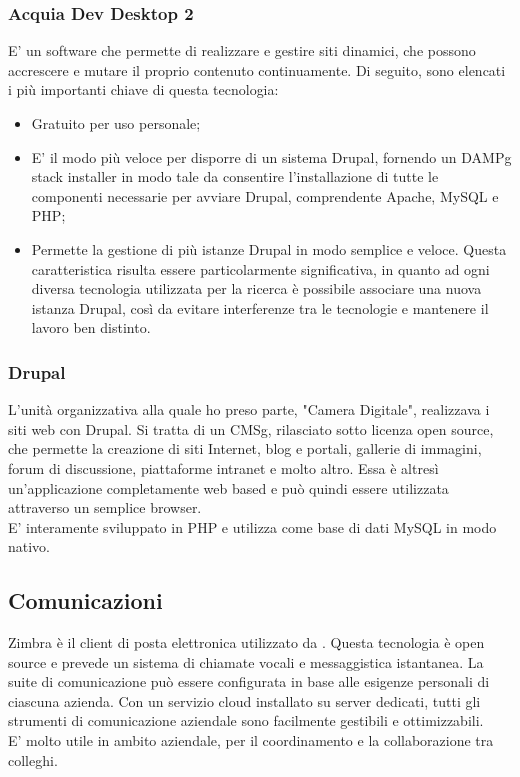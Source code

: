 		\subsubsection{Acquia Dev Desktop 2}
		E’ un software che permette di realizzare e gestire siti dinamici, che possono accrescere e mutare il proprio contenuto continuamente.
		Di seguito, sono elencati i più importanti chiave di questa tecnologia:
		\begin{itemize}
			\item {Gratuito per uso personale;}
			\item {E' il modo più veloce per disporre di un sistema \gls{Drupal}, fornendo un \gls{DAMPg} stack installer in modo tale da consentire l'installazione di tutte le componenti necessarie per avviare \gls{Drupal}, comprendente \gls{Apache}, \gls{MySQL} e \gls{PHP};}
			\item {Permette la gestione di più istanze \gls{Drupal} in modo semplice e veloce. Questa caratteristica risulta essere particolarmente significativa, in quanto ad ogni diversa tecnologia utilizzata per la ricerca è possibile associare una nuova istanza \gls{Drupal}, così da evitare interferenze tra le tecnologie e mantenere il lavoro ben distinto.}
		\end{itemize}
	
		\subsubsection{Drupal}
		L'unità organizzativa alla quale ho preso parte, "Camera Digitale", realizzava i siti web con \gls{Drupal}. Si tratta di un \gls{CMSg}, rilasciato sotto licenza \gls{open source}, che permette la creazione di siti Internet, blog e portali, gallerie di immagini, forum di discussione, piattaforme intranet e molto altro. Essa è altresì un’applicazione completamente web based e può quindi essere utilizzata attraverso un semplice browser. \\
		E' interamente sviluppato in \gls{PHP} e utilizza come base di dati \gls{MySQL} in modo nativo. \\
		
	\subsection{Comunicazioni}
	\gls{Zimbra} è il client di posta elettronica utilizzato da \nomeAzienda. Questa tecnologia è \gls{open source} e prevede un sistema di chiamate vocali e messaggistica istantanea. La suite di comunicazione può essere configurata in base alle esigenze personali di ciascuna azienda. Con un servizio cloud installato su server dedicati, tutti gli strumenti di comunicazione aziendale sono facilmente gestibili e ottimizzabili. \\
	E' molto utile in ambito aziendale, per il coordinamento e la collaborazione tra colleghi.
	
